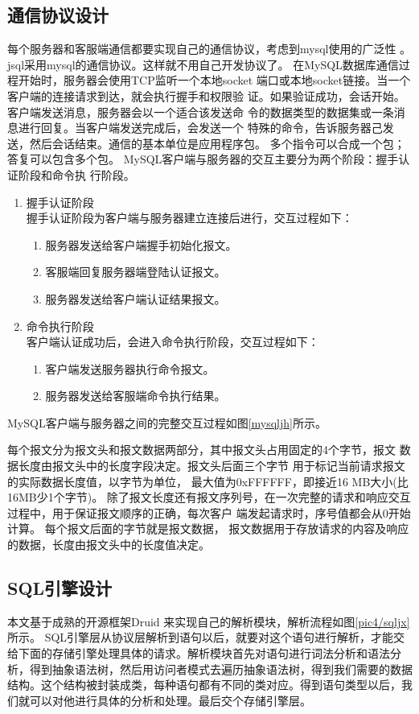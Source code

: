 \subsection{通信协议设计}
每个服务器和客服端通信都要实现自己的通信协议，考虑到mysql使用的广泛性
。jsql采用mysql的通信协议。这样就不用自己开发协议了。
在MySQL数据库通信过程开始时，服务器会使用TCP监听一个本地socket
端口或本地socket链接。当一个客户端的连接请求到达，就会执行握手和权限验
证。如果验证成功，会话开始。客户端发送消息，服务器会以一个适合该发送命
令的数据类型的数据集或一条消息进行回复。当客户端发送完成后，会发送一个
特殊的命令，告诉服务器己发送，然后会话结束。通信的基本单位是应用程序包。
多个指令可以合成一个包；答复可以包含多个包。
MySQL客户端与服务器的交互主要分为两个阶段：握手认证阶段和命令执
行阶段。

\begin{enumerate}[fullwidth,itemindent=2em,listparindent=2em]
	\item 握手认证阶段\\
	握手认证阶段为客户端与服务器建立连接后进行，交互过程如下：
	\begin{enumerate}
		\item 服务器发送给客户端握手初始化报文。
		\item 客服端回复服务器端登陆认证报文。
		\item 服务器发送给客户端认证结果报文。
	\end{enumerate}
	\item 命令执行阶段\\
	客户端认证成功后，会进入命令执行阶段，交互过程如下：
	\begin{enumerate}
		\item 	客户端发送服务器执行命令报文。
		\item 服务器发送给客服端命令执行结果。
	\end{enumerate}
\end{enumerate}

MySQL客户端与服务器之间的完整交互过程如图\ref{mysqljh}所示。

每个报文分为报文头和报文数据两部分，其中报文头占用固定的4个字节，报文
数据长度由报文头中的长度字段决定。报文头后面三个字节
用于标记当前请求报文的实际数据长度值，以字节为单位，
最大值为0xFFFFFF，即接近16 MB大小(比16MB少1个字节)。
除了报文长度还有报文序列号，在一次完整的请求和响应交互过程中，用于保证报文顺序的正确，每次客户
端发起请求时，序号值都会从0开始计算。
每个报文后面的字节就是报文数据，
报文数据用于存放请求的内容及响应的数据，长度由报文头中的长度值决定。
\subsection{SQL引擎设计}
本文基于成熟的开源框架Druid
来实现自己的解析模块，解析流程如图\ref{pic4/sqljx}所示。
SQL引擎层从协议层解析到语句以后，就要对这个语句进行解析，才能交给下面的存储引擎处理具体的请求。解析模块首先对语句进行词法分析和语法分析，得到抽象语法树，然后用访问者模式去遍历抽象语法树，得到我们需要的数据结构。这个结构被封装成类，每种语句都有不同的类对应。得到语句类型以后，我们就可以对他进行具体的分析和处理。最后交个存储引擎层。
